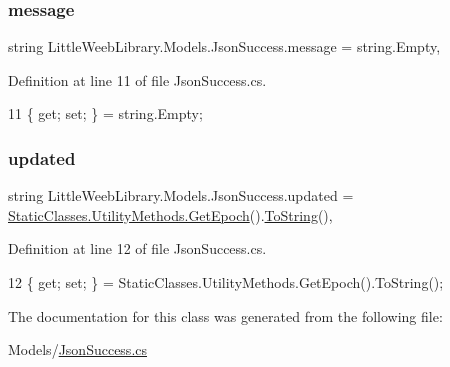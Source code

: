 \subsubsection{\texorpdfstring{message}{message}}
{\footnotesize\ttfamily string Little\+Weeb\+Library.\+Models.\+Json\+Success.\+message = string.\+Empty\hspace{0.3cm}{\ttfamily [get]}, {\ttfamily [set]}}



Definition at line 11 of file Json\+Success.\+cs.


\begin{DoxyCode}
11 \{ \textcolor{keyword}{get}; \textcolor{keyword}{set}; \} = \textcolor{keywordtype}{string}.Empty;
\end{DoxyCode}
\mbox{\label{class_little_weeb_library_1_1_models_1_1_json_success_a486c79938bb53ac4092683da49a07a18}} 
\subsubsection{\texorpdfstring{updated}{updated}}
{\footnotesize\ttfamily string Little\+Weeb\+Library.\+Models.\+Json\+Success.\+updated = \mbox{\hyperlink{class_little_weeb_library_1_1_static_classes_1_1_utility_methods_a12336d9e64983ddabaad8950486fafb2}{Static\+Classes.\+Utility\+Methods.\+Get\+Epoch}}().\mbox{\hyperlink{class_little_weeb_library_1_1_models_1_1_json_success_abd0bbcc176b7accbefc425a70816b12a}{To\+String}}()\hspace{0.3cm}{\ttfamily [get]}, {\ttfamily [set]}}



Definition at line 12 of file Json\+Success.\+cs.


\begin{DoxyCode}
12 \{ \textcolor{keyword}{get}; \textcolor{keyword}{set}; \} = StaticClasses.UtilityMethods.GetEpoch().ToString();
\end{DoxyCode}


The documentation for this class was generated from the following file\+:\begin{DoxyCompactItemize}
\item 
Models/\mbox{\hyperlink{_json_success_8cs}{Json\+Success.\+cs}}\end{DoxyCompactItemize}
